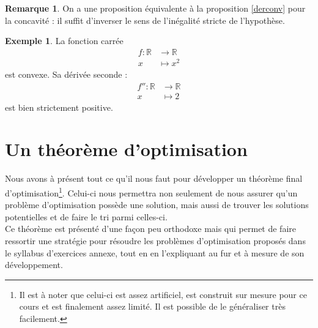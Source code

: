 \documentclass[a4paper,fontsize=13pt]{scrreprt}
\theoremstyle{plain}
\theoremstyle{definition}
\newtheorem{exe}[subsection]{Exemple}
\newtheorem{rema}[subsection]{Remarque}
\newcommand{\rr}{\mathbb{R}}
\begin{document}
\begin{rema}
On a une proposition équivalente à la proposition \ref{derconv} pour la concavité : il suffit d'inverser le sens de l'inégalité stricte de l'hypothèse.
\end{rema}
\begin{exe}
La fonction carrée
\begin{align*}
f : \rr &\to \rr \\
x &\mapsto x^2
\end{align*}
est convexe. Sa dérivée seconde :
\begin{align*}
f'' : \rr &\to \rr \\
x &\mapsto 2
\end{align*}
est bien strictement positive.
\end{exe}
\section{Un théorème d'optimisation}
Nous avons à présent tout ce qu'il nous faut pour développer un théorème final d'optimisation\footnote{Il est à noter que celui-ci est assez artificiel, est construit sur mesure pour ce cours et est finalement assez limité. Il est possible de le généraliser très facilement.}. Celui-ci nous permettra non seulement de nous assurer qu'un problème d'optimisation possède une solution, mais aussi de trouver les solutions potentielles et de faire le tri parmi celles-ci. \\
Ce théorème est présenté d'une façon peu orthodoxe mais qui permet de faire ressortir une stratégie pour résoudre les problèmes d'optimisation proposés dans le syllabus d'exercices annexe, tout en en l'expliquant au fur et à mesure de son développement.
\end{document}
